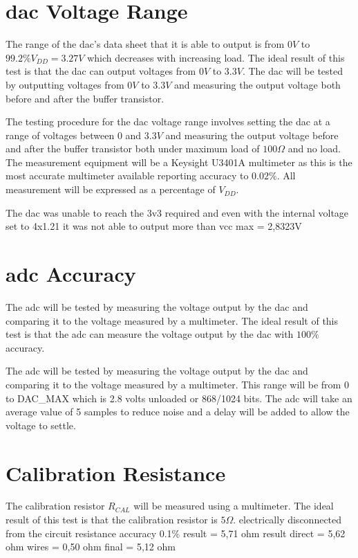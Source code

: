 \section{\gls{dac} Voltage Range}\label{sec:dac-voltage-range}

The range of the \gls{dac}'s data sheet that it is able to output is from $0V$ to $99.2\% V_{DD} = 3.27V$ which decreases with increasing load.
The ideal result of this test is that the \gls{dac} can output voltages from $0V$ to $3.3V$.
The \gls{dac} will be tested by outputting voltages from $0V$ to $3.3V$ and measuring the output voltage both before and after the buffer transistor.

The testing procedure for the \gls{dac} voltage range involves setting the \gls{dac} at a range of voltages between $0$ and $3.3V$ and measuring the output voltage before and after the buffer transistor both under maximum load of $100\Omega$ and no load.
The measurement equipment will be a Keysight U3401A multimeter as this is the most accurate multimeter available reporting accuracy to $0.02\%$. 
All measurement will be expressed as a percentage of $V_{DD}$.

The \gls{dac} was unable to reach the 3v3 required and even with the internal voltage set to 4x1.21 it was not able to output more than vcc
max = 2,8323V

\section{\gls{adc} Accuracy}\label{sec:adc-accuracy}

The \gls{adc} will be tested by measuring the voltage output by the \gls{dac} and comparing it to the voltage measured by a multimeter.
The ideal result of this test is that the \gls{adc} can measure the voltage output by the \gls{dac} with $100\%$ accuracy.

The \gls{adc} will be tested by measuring the voltage output by the \gls{dac} and comparing it to the voltage measured by a multimeter.
This range will be from 0 to DAC\_MAX which is 2.8 volts unloaded or 868/1024 bits.
The adc will take an average value of 5 samples to reduce noise and a delay will be added to allow the voltage to settle.

\section{Calibration Resistance}\label{sec:calibration-resistance}

The calibration resistor $R_{CAL}$ will be measured using a multimeter.
The ideal result of this test is that the calibration resistor is $5\Omega$. 
electrically disconnected from the circuit
resistance accuracy 0.1\%
result = 5,71 ohm
result direct = 5,62 ohm
wires = 0,50 ohm
final = 5,12 ohm


